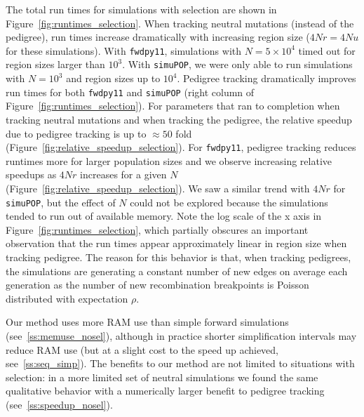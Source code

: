 \documentclass{article}
\newcommand{\simupop}{\texttt{simuPOP}}
\newcommand{\fwdpy}{\texttt{fwdpy11}}
\newcommand{\krt}[1]{{\em \color{green} #1}}
\begin{document}


The total run times for simulations with selection are shown in Figure~\ref{fig:runtimes_selection}.  When tracking
neutral mutations (instead of the pedigree), run times increase dramatically with increasing region size ($4Nr = 4Nu$ for
these simulations).  With \fwdpy{}, simulations with $N=5 \times 10^4$ timed out for region sizes larger than $10^3$.
With \simupop{}, we were only able to run simulations with $N=10^3$ and region sizes up to $10^4$.  Pedigree tracking
dramatically improves run times for both \fwdpy{} and \simupop{} (right column of Figure~\ref{fig:runtimes_selection}).  For parameters that ran to completion when tracking neutral mutations and when tracking
the pedigree, the relative speedup due to pedigree tracking is up to $\approx 50$ fold
(Figure~\ref{fig:relative_speedup_selection}).  For \fwdpy{}, pedigree tracking reduces runtimes more for larger
population sizes and we observe increasing relative speedups as $4Nr$ increases for a given $N$
(Figure~\ref{fig:relative_speedup_selection}).  We saw a similar trend with $4Nr$ for \simupop{}, but the effect of $N$
could not be explored because the simulations tended to run out of available memory.
  Note the log scale of the x axis in Figure~\ref{fig:runtimes_selection}, which
partially obscures an important observation that the run times appear approximately linear in region size when tracking
pedigree.  The reason for this behavior is that, when tracking pedigrees, the simulations are generating a constant number of new edges on
average
each generation as the number of new recombination breakpoints is Poisson distributed with expectation $\rho$.

Our method uses more RAM use than simple forward simulations (see~\ref{ss:memuse_nosel}),
although in practice shorter simplification intervals may reduce RAM use
(but at a slight cost to the speed up achieved, see~\ref{ss:seq_simp}).
The benefits to our method are not limited to situations with selection:
in a more limited set of neutral simulations we found the same qualitative
behavior with a numerically larger benefit to pedigree tracking (see~\ref{ss:speedup_nosel}).
\end{document}
